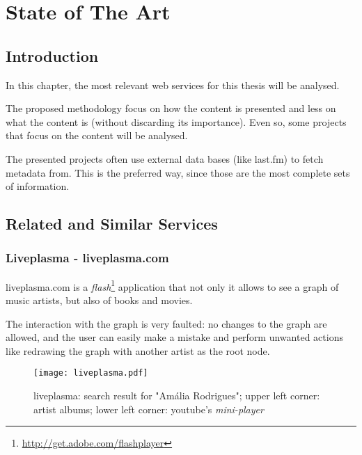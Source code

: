 
\chapter{State of The Art} \label{chap:chap2}

\section*{}


\section{Introduction}

In this chapter, the most relevant web services for this thesis will be analysed.

The proposed methodology focus on how the content is presented and less on what the content is (without discarding its importance).
Even so, some projects that focus on the content will be analysed.

The presented projects often use external data bases (like last.fm) to fetch metadata from.
This is the preferred way, since those are the most complete sets of information. 

\section{Related and Similar Services} %
\label{sec:related_similar_services}

\subsection{Liveplasma - liveplasma.com} %
\label{sub:liveplasma}

liveplasma.com is a \emph{flash}\footnote{\url{http://get.adobe.com/flashplayer}} application that not only it allows to see a graph of music artists, but also of books and movies.

The interaction with the graph is very faulted: no changes to the graph are allowed, and the user can easily make a mistake and perform unwanted actions like redrawing the graph with another artist as the root node.

\begin{figure}
  \begin{center}
    \texttt{[image: liveplasma.pdf]}
  \end{center}
  \caption{liveplasma: search result for "Amália Rodrigues"; upper left corner: artist albums; lower left corner: youtube's \emph{mini-player}}
  \label{fig:sota_liveplasma}
\end{figure}

